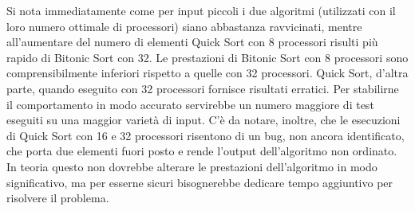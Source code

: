 Si nota immediatamente come per input piccoli i due algoritmi (utilizzati con il loro numero ottimale di processori) siano abbastanza ravvicinati, mentre all'aumentare del numero di elementi Quick Sort con 8 processori risulti più rapido di Bitonic Sort con 32. Le prestazioni di Bitonic Sort con 8 processori sono comprensibilmente inferiori rispetto a quelle con 32 processori. Quick Sort, d'altra parte, quando eseguito con 32 processori fornisce risultati erratici. Per stabilirne il comportamento in modo accurato servirebbe un numero maggiore di test eseguiti su una maggior varietà di input.
C'è da notare, inoltre, che le esecuzioni di Quick Sort con 16 e 32 processori risentono di un bug, non ancora identificato, che porta due elementi fuori posto e rende l'output dell'algoritmo non ordinato. In teoria questo non dovrebbe alterare le prestazioni dell'algoritmo in modo significativo, ma per esserne sicuri bisognerebbe dedicare tempo aggiuntivo per risolvere il problema.